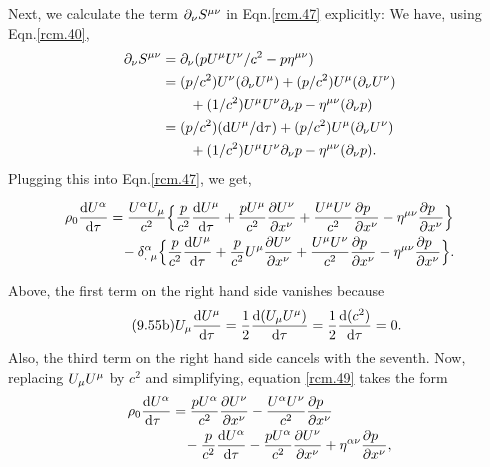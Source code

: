 Next, we calculate the term ${\partial}_{{\nu}} S^{{\mu}{\nu}}$ in 
Eqn.\eqref{rcm.47}   explicitly: We have, using 
Eqn.\eqref{rcm.40},
\begin{align}\label{rcm.48}
{\ensuremath{\partial}}_{{\nu}} S^{{\mu}{\nu}}
&={\partial}_{{\nu}} (p U^{{\mu}} U^{{\nu}}/c^2
-p\eta^{{\mu}{\nu}})\notag\\
&=(p/c^2)U^{{\nu}}({\partial}_{{\nu}} U^{{\mu}})
+(p/c^2)U^{{\mu}} ({\partial}_{{\nu}} U^{{\nu}})\notag\\&\qquad
+(1/c^2)U^{{\mu}} U^{{\nu}}{\partial}_{{\nu}} p
-\eta^{{\mu}{\nu}}({\partial}_{{\nu}} p)\notag\\
&=(p/c^2) (\mathrm{d} U^{{\mu}}/\mathrm{d} {\tau}) 
+(p/c^2) U^{{\mu}} ({\partial}_{{\nu}} U^{{\nu}})\notag\\&\qquad
+(1/c^2)U^{{\mu}} U^{{\nu}}{\partial}_{{\nu}} p
-\eta^{{\mu}{\nu}}({\partial}_{{\nu}} p).
\end{align}
Plugging this into Eqn.\eqref{rcm.47}, we get,
\begin{scriptsize}\begin{align} \label{rcm.49}
&\rho_0 \frac{\mathrm{d} U^{{\alpha}}}{\mathrm{d} {\tau}}= 
\frac{U^{{\alpha}} U_{{\mu}}}{c^2}\Big\{ \frac{p}{c^2} \frac{\mathrm{d} 
U^{{\mu}}}{\mathrm{d} {\tau}} 
+\frac{pU^{{\mu}}}{c^2} \frac{{\partial} U^{{\nu}}}{{\partial} 
x^{{\nu}}}
+\frac{U^{{\mu}} U^{{\nu}}}{c^2} \frac{{\partial} p\;\;}{{\partial} x^{{\nu}}} 
-\eta^{{\mu}{\nu}} \frac{{\partial} p\;\;}{{\partial} x^{{\nu}}}\Big\}
\notag\\
&\qquad\qquad -{{{\delta}}^{{\alpha}}_{.\;{\mu}}}\Big\{
\frac{p}{c^2}\frac{\mathrm{d} U^{{\mu}}}{\mathrm{d} {\tau}}  
+\frac{p}{c^2}U^{{\mu}} \frac{{\partial} U^{{\nu}}}{{\partial} x^{{\nu}}}
+\frac{U^{{\mu}} U^{{\nu}}}{c^2} \frac{{\partial} p\;\;}{{\partial} x^{{\nu}}}
-\eta^{{\mu}{\nu}}\frac{{\partial} p\;\;}{{\partial} x^{{\nu}}}\Big\}.
\end{align}\end{scriptsize}
\nnnt Above, the first term on the right hand side 
vanishes  because
\begin{align}\tag{9.55b}
&U_{{\mu}}\frac{\mathrm{d} U^{{\mu}}}{\mathrm{d}{\tau}}=\frac{1}{2}\frac{\mathrm{d} 
(U_{{\mu}} U^{{\mu}})}{\mathrm{d}{\tau}}=\frac{1}{2}\frac{\mathrm{d} 
(c^2)}{\mathrm{d}{\tau}}=0.
\end{align} 
Also, the third  term on the right hand side cancels with 
the seventh.  Now,  replacing  $U_{{\mu}} U^{{\mu}}$ by $c^2$ and 
simplifying, equation \eqref{rcm.49} takes the form 
\begin{align}\label{rcm.50}
&\rho_0\frac{\mathrm{d} U^{{\alpha}}}{\mathrm{d}{\tau}\;\:}
= \frac{p U^{{\alpha}} }{c^2}\frac{{\partial} U^{{\nu}}}{{\partial} x^{{\nu}}} 
-\frac{U^{{\alpha}} U^{{\nu}} }{c^2}\frac{{\partial} p\;\;}{{\partial} x^{{\nu}}} 
\notag\\ &\qquad\qquad
-\frac{p}{c^2}\frac{\mathrm{d} U^{{\alpha}}}{\mathrm{d} {\tau}} 
-\frac{pU^{{\alpha}}}{c^2} \frac{{\partial} U^{{\nu}}}{{\partial} x^{{\nu}}} 
+\eta^{{\alpha}{\nu}}\frac{{\partial} p\;\;}{{\partial} x^{{\nu}}},
\end{align}
